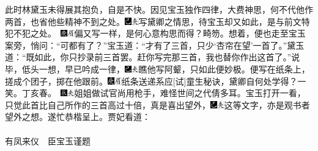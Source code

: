 此时林黛玉未得展其抱负，自是不快。因见宝玉独作四律，大费神思，何不代他作两首，也省他些精神不到之处。{\includegraphics[width=3mm]{../Images/00003}\includegraphics[width=3mm]{../Images/00012}\footnotesize \kaishu 写黛卿之情思，待宝玉却又如此，是与前文特犯不犯之处。　{\includegraphics[width=3mm]{../Images/00004}\includegraphics[width=3mm]{../Images/00010}\footnotesize \kaishu 偏又写一样，是何心意构思而得？畸笏。}}想着，便也走至宝玉案旁，悄问：“可都有了？”宝玉道：“才有了三首，只少‘杏帘在望’一首了。”黛玉道：“既如此，你只抄录前三首罢。赶你写完那三首，我也替你作出这首了。”说毕，低头一想，早已吟成一律，{\includegraphics[width=3mm]{../Images/00003}\includegraphics[width=3mm]{../Images/00012}\footnotesize \kaishu 瞧他写阿颦，只如此便妙极。}便写在纸条上，搓成个团子，掷在他跟前。{{\includegraphics[width=3mm]{../Images/00004}\includegraphics[width=3mm]{../Images/00010}\footnotesize \kaishu 纸条送递系应{[}试{]}童生秘诀，黛卿自何处学得？一笑。丁亥春。　}\includegraphics[width=3mm]{../Images/00009}\includegraphics[width=3mm]{../Images/00012}\footnotesize \kaishu 姐姐做试官尚用枪手，难怪世间之代倩多耳。}宝玉打开一看，只觉此首比自己所作的三首高过十倍，真是喜出望外，{\includegraphics[width=3mm]{../Images/00003}\includegraphics[width=3mm]{../Images/00012}\footnotesize \kaishu 这等文字，亦是观书者望外之想。}遂忙恭楷呈上。贾妃看道：
\\
\\
\indent
有凤来仪　臣宝玉谨题

